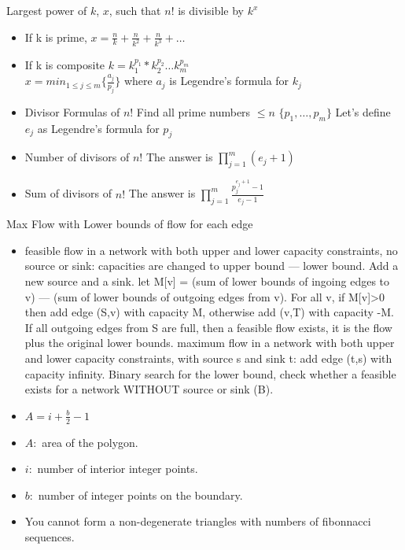  Largest power of $k$, $x$, such that $n!$ is divisible by $k^x$
\begin{itemize}
\item If k is prime, $x = \frac{n}{k} + \frac{n}{k^2} +\frac{n}{k^3}+ \dots $
\item If k is composite $k =  k_1^{p_1}* k_2^{p_2}\dots k_m^{p_m} $ \\
	$ x = min_{1\leq j\leq m}\{ \frac{a_j}{p_j} \}$ where $a_j$ is Legendre's formula for $k_j$
\item Divisor Formulas of $n!$ Find all prime numbers $\leq n$ $\{ p_1, \dots, p_m \}$ Let's define $e_j$ as Legendre's formula for $p_j$
\item Number of divisors of $n!$ The answer is $\prod_{j=1}^m (e_j +1)$
\item Sum of divisors of $n!$ The answer is  $\prod_{j=1}^m \frac{p_j^{e_j+1}-1}{e_j-1}$  \\
\end{itemize}

 Max Flow with Lower bounds of flow for each edge
\begin{itemize}
\item feasible flow in a network with both upper and lower capacity constraints, no source or sink: capacities are changed to upper bound — lower bound. Add a new source and a sink. let M[v] = (sum of lower bounds of ingoing edges to v) — (sum of lower bounds of outgoing edges from v). For all v, if M[v]>0 then add edge (S,v) with capacity M, otherwise add (v,T) with capacity -M. If all outgoing edges from S are full, then a feasible flow exists, it is the flow plus the original lower bounds.
maximum flow in a network with both upper and lower capacity constraints, with source s and sink t: add edge (t,s) with capacity infinity. Binary search for the lower bound, check whether a feasible exists for a network WITHOUT source or sink (B).
\end{itemize}

\begin{itemize}
  \item $A = i+\frac{b}{2}-1$
  \item $A:$ area of the polygon.
  \item $i:$ number of interior integer points.
  \item $b:$ number of integer points on the boundary.
\end{itemize}

\begin{itemize}
  \item You cannot form a non-degenerate triangles with numbers of fibonnacci sequences.
\end{itemize}